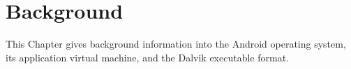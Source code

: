 \chapter{Background}
\label{chap:background}

This Chapter gives background information into the Android operating system, its application virtual machine, and the Dalvik executable format.









